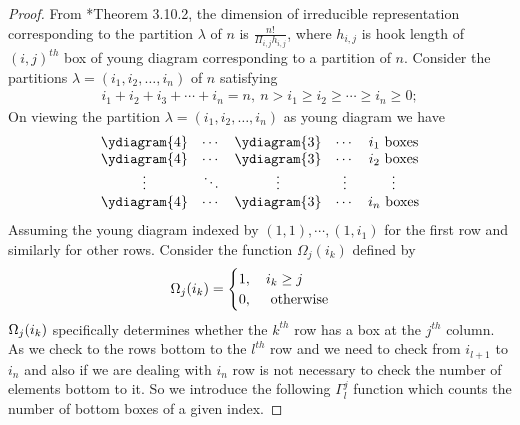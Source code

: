 \documentclass[oneside]{amsart}
\theoremstyle{plain}
\theoremstyle{definition}
\theoremstyle{remark}
\begin{document}
    \begin{proof}
        From \cite{MR1824028}*{Theorem 3.10.2}, the dimension of irreducible representation corresponding to the partition $\lambda$ of $n$ is $\frac{n!}{\Pi_{i, j}h_{i, j}}$, where $h_{i,j}$ is hook length of $(i,j)^{th}$ box of young diagram corresponding to a partition of $n$. Consider the partitions $\lambda = (i_1, i_2, \ldots, i_n)$ of $n$ satisfying
        \begin{align*}
            i_1 + i_2 + i_3 + \cdots + i_n = n,\ n > i_1 \geq i_2 \geq \cdots \geq i_n \geq 0;
        \end{align*}
        On viewing the partition $\lambda = (i_1, i_2, \ldots, i_n)$ as young diagram we have 
        \[
            \begin{array}{c c c c c}
            \ydiagram{4} & \cdots &\ydiagram{3} & \cdots & i_1 \text{ boxes}\\
            \ydiagram{4} & \cdots &\ydiagram{3} & \cdots & i_2 \text{ boxes}\\
            \vdots & \ddots & \vdots & \vdots & \vdots\\
            \ydiagram{4} & \cdots & \ydiagram{3}& \cdots & i_n \text{ boxes}
            \end{array}
        \]
        Assuming the young diagram indexed by $(1, 1), \cdots, (1, i_1)$ for the first row and similarly for other rows. 
        Consider the function ${\Omega}_j(i_k)$ defined by
        \begin{align*}
            {\Large\Omega}_j(i_k) = \begin{cases}
                    1, \quad i_k \geq j\\
                        0, \quad \text{ otherwise }
            \end{cases}
        \end{align*}
        ${\Large\Omega}_j(i_k)$ specifically determines whether the $k^{th}$ row has a box at the $j^{th}$ column. As we check to the rows bottom to the $l^{th}$ row and we need to check from $i_{l + 1}$ to $i_n$ and also if we are dealing with $i_n$ row is not necessary to check the number of elements bottom to it. So we introduce the following ${\Gamma}_l^j$ function which counts the number of bottom boxes of a given index.

\end{proof}
\end{document}

